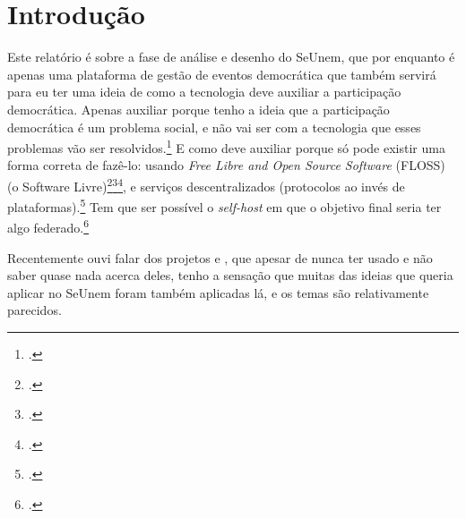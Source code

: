 \documentclass[12pt,a4paper,openright,oneside]{memoir}
\begin{document}

\clearpage
{}

\chapter{Introdução}
\label{ch:intro}


Este relatório é sobre a fase de análise e desenho do SeUnem, que por enquanto
é apenas uma plataforma de gestão de eventos democrática que também servirá
para eu ter uma ideia de como a tecnologia deve auxiliar a participação
democrática. Apenas auxiliar porque tenho a ideia que a participação
democrática é um problema social, e não vai ser com a tecnologia que esses
problemas vão ser resolvidos.\footcite{d3_vote} E como deve auxiliar porque só
pode existir uma forma correta de fazê-lo: usando \textit{Free Libre and Open
Source Software} (FLOSS) (o Software
Livre)\footcite{ansol_software_livre}\footcite{fsf_about_free_software}\footcite{gnu_free_software},
e serviços descentralizados (protocolos ao invés de
plataformas).\footcite{d3_platforms_protocols} Tem que ser possível o
\textit{self-host} em que o objetivo final seria ter algo
federado.\footcite{fedigov}

Recentemente ouvi falar dos projetos \autocite{decidim} e \autocite{voca}, que
apesar de nunca ter usado e não saber quase nada acerca deles, tenho a sensação
que muitas das ideias que queria aplicar no SeUnem foram também aplicadas lá, e
os temas são relativamente parecidos.
\end{document}
